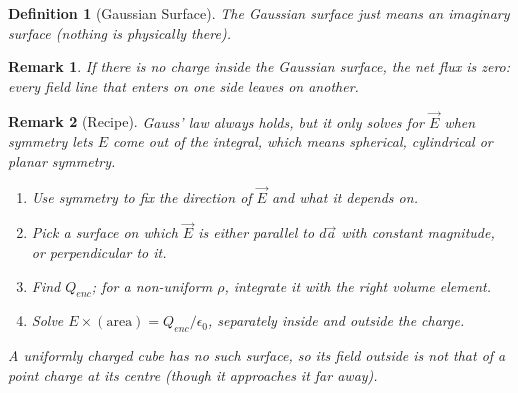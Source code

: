 \documentclass{article}
\newtheorem{definition}{Definition}
\newtheorem{remark}{Remark}
\begin{document}
\begin{definition}[Gaussian Surface]
    The Gaussian surface just means an imaginary surface (nothing is physically there).
\end{definition}
\begin{remark}
    If there is no charge inside the Gaussian surface, the net flux is zero: every field line that enters on one side leaves on another.
\end{remark}
\begin{remark}[Recipe]
    Gauss' law always holds, but it only solves for $\vec{E}$ when symmetry lets $E$ come out of the integral, which means spherical, cylindrical or planar symmetry.
    \begin{enumerate}
        \item Use symmetry to fix the direction of $\vec{E}$ and what it depends on.
        \item Pick a surface on which $\vec{E}$ is either parallel to $d\vec{a}$ with constant magnitude, or perpendicular to it.
        \item Find $Q_{enc}$; for a non-uniform $\rho$, integrate it with the right volume element.
        \item Solve $E \times (\text{area}) = Q_{enc}/\epsilon_0$, separately inside and outside the charge.
    \end{enumerate}
    A uniformly charged cube has no such surface, so its field outside is not that of a point charge at its centre (though it approaches it far away).
\end{remark}
\end{document}
